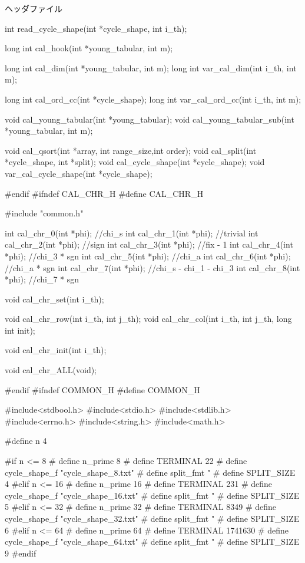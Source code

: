 \documentclass{jreport}
\begin{document}
ヘッダファイル
\begin{tabular}{}
int read_cycle_shape(int *cycle_shape, int i_th);

long int cal_hook(int *young_tabular, int m);

long int cal_dim(int *young_tabular, int m);
long int var_cal_dim(int i_th, int m);

long int cal_ord_cc(int *cycle_shape);
long int var_cal_ord_cc(int i_th, int m);

void cal_young_tabular(int *young_tabular);
void cal_young_tabular_sub(int *young_tabular, int m);

void cal_qsort(int *array, int range_size,int order);
void cal_split(int *cycle_shape, int *split);
void cal_cycle_shape(int *cycle_shape);
void var_cal_cycle_shape(int *cycle_shape);

#endif
#ifndef CAL_CHR_H
#define CAL_CHR_H

#include "common.h"

int cal_chr_0(int *phi);	//chi_s
int cal_chr_1(int *phi);	//trivial
int cal_chr_2(int *phi);	//sign
int cal_chr_3(int *phi);	//fix - 1
int cal_chr_4(int *phi);	//chi_3 * sgn
int cal_chr_5(int *phi);	//chi_a
int cal_chr_6(int *phi);	//chi_a * sgn
int cal_chr_7(int *phi);	//chi_s - chi_1 - chi_3
int cal_chr_8(int *phi);	//chi_7 * sgn

void cal_chr_set(int i_th);

void cal_chr_row(int i_th, int j_th);
void cal_chr_col(int i_th, int j_th, long int init);

void cal_chr_init(int i_th);

void cal_chr_ALL(void);




#endif
#ifndef COMMON_H
#define COMMON_H

#include<stdbool.h>
#include<stdio.h>
#include<stdlib.h>
#include<errno.h>
#include<string.h>
#include<math.h>

#define n 4



#if n <= 8
#	define n_prime 8
#	define TERMINAL 22
#	define cycle_shape_f "cycle_shape_8.txt"
#	define split_fmt "%
#	define SPLIT_SIZE 4
#elif n <= 16
#	define n_prime 16
#	define TERMINAL 231
#	define cycle_shape_f "cycle_shape_16.txt"
#	define split_fmt "%
#	define SPLIT_SIZE 5
#elif n <= 32
#	define n_prime 32
#	define TERMINAL 8349
#	define cycle_shape_f "cycle_shape_32.txt"
#	define split_fmt "%
#	define SPLIT_SIZE 6
#elif n <= 64
#	define n_prime 64
#	define TERMINAL 1741630
#	define cycle_shape_f "cycle_shape_64.txt"
#	define split_fmt "%
#	define SPLIT_SIZE 9
#endif


\end{tabular}
\end{document}
